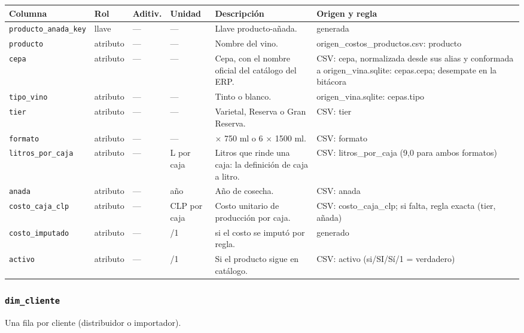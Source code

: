 {\footnotesize
\begin{longtable}{@{}>{\raggedright\arraybackslash}p{}>{\raggedright\arraybackslash}p{}>{\raggedright\arraybackslash}p{}>{\raggedright\arraybackslash}p{}>{\raggedright\arraybackslash}p{}>{\raggedright\arraybackslash}p{}@{}}
\toprule
Columna & Rol & Aditiv. & Unidad & Descripción & Origen y regla \\
\midrule
\endhead
\texttt{producto\_anada\_key} & llave & — & — & Llave producto-añada. & generada \\
\texttt{producto} & atributo & — & — & Nombre del vino. & origen\_costos\_productos.\allowbreak{}csv: producto \\
\texttt{cepa} & atributo & — & — & Cepa, con el nombre oficial del catálogo del ERP. & CSV: cepa, normalizada desde sus alias y conformada a origen\_vina.\allowbreak{}sqlite: cepas.\allowbreak{}cepa; desempate en la bitácora \\
\texttt{tipo\_vino} & atributo & — & — & Tinto o blanco. & origen\_vina.\allowbreak{}sqlite: cepas.\allowbreak{}tipo \\
\texttt{tier} & atributo & — & — & Varietal, Reserva o Gran Reserva. & CSV: tier \\
\texttt{formato} & atributo & — & — & 12 $\times$ 750 ml o 6 $\times$ 1500 ml. & CSV: formato \\
\texttt{litros\_por\_caja} & atributo & — & L por caja & Litros que rinde una caja: la definición de caja a litro. & CSV: litros\_por\_caja (9,0 para ambos formatos) \\
\texttt{anada} & atributo & — & año & Año de cosecha. & CSV: anada \\
\texttt{costo\_caja\_clp} & atributo & — & CLP por caja & Costo unitario de producción por caja. & CSV: costo\_caja\_clp; si falta, regla exacta (tier, añada) \\
\texttt{costo\_imputado} & atributo & — & 0/1 & 1 si el costo se imputó por regla. & generado \\
\texttt{activo} & atributo & — & 0/1 & Si el producto sigue en catálogo. & CSV: activo (si/SI/Sí/1 = verdadero) \\
\bottomrule
\end{longtable}
}

\subsubsection*{\texttt{dim\_cliente}}
Una fila por cliente (distribuidor o importador).

